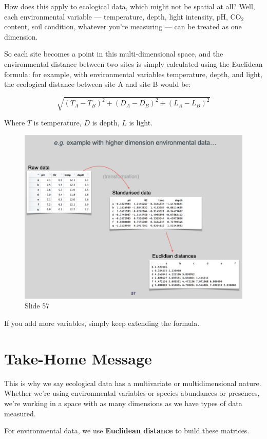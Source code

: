 \documentclass[
  12pt,
]{book}
\begin{document}
How does this apply to ecological data, which might not be spatial at
all? Well, each environmental variable --- temperature, depth, light
intensity, pH, CO\(_2\) content, soil condition, whatever you're
measuring --- can be treated as one dimension.

So each site becomes a point in this multi-dimensional space, and the
environmental distance between two sites is simply calculated using the
Euclidean formula: for example, with environmental variables
temperature, depth, and light, the ecological distance between site A
and site B would be:

\[
\sqrt{(T_A - T_B)^2 + (D_A - D_B)^2 + (L_A - L_B)^2}
\]

Where \(T\) is temperature, \(D\) is depth, \(L\) is light.

\begin{figure}[ht]
\centering
\includegraphics[width=0.8\linewidth]{../images/BDC334/BDC334-057.jpeg}
\caption*{Slide 57}
\end{figure}

If you add more variables, simply keep extending the formula.

\section{Take-Home Message}\label{take-home-message}

This is why we say ecological data has a multivariate or
multidimensional nature. Whether we're using environmental variables or
species abundances or presences, we're working in a space with as many
dimensions as we have types of data measured.

For environmental data, we use \textbf{Euclidean distance} to build
these matrices.
\end{document}
